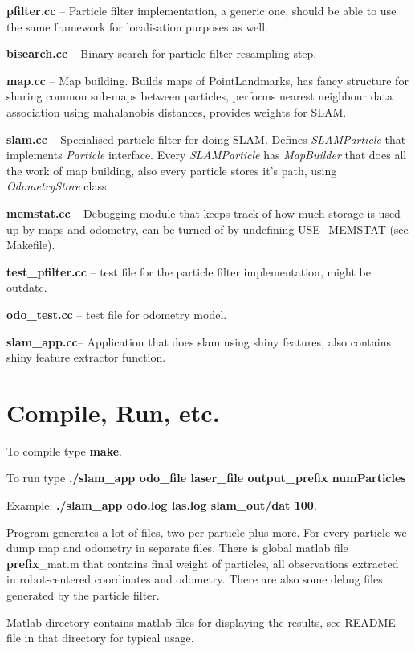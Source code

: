 \documentclass{article}
\begin{document}
\textbf{ pfilter.cc }-- Particle filter implementation, a generic
one, should be able to use the same framework for localisation
purposes as well.

\textbf{ bisearch.cc }-- Binary search for particle filter resampling step.

\textbf{ map.cc }-- Map building. Builds maps of PointLandmarks, has
fancy structure for sharing common sub-maps between particles, performs
nearest neighbour data association using mahalanobis distances,
provides weights for SLAM.

\textbf{ slam.cc }-- Specialised particle filter for doing
SLAM. Defines \textit{SLAMParticle} that implements \textit{Particle}
interface. Every \textit{SLAMParticle} has \textit{MapBuilder} that
does all the work of map building, also every particle stores it's
path, using \textit{OdometryStore} class.

\textbf{ memstat.cc }-- Debugging module that keeps track of how much
storage is used up by maps and odometry, can be turned of by
undefining USE\_MEMSTAT (see Makefile).

\textbf{ test\_pfilter.cc }-- test file for the particle filter
implementation, might be outdate.

\textbf{ odo\_test.cc }-- test file for odometry model.

\textbf{ slam\_app.cc}-- Application that does slam using shiny
features, also contains shiny feature extractor function.

\section{Compile, Run, etc.}

To compile type \textbf{make}.

To run type \textbf{./slam\_app odo\_file laser\_file output\_prefix
numParticles}

Example: \textbf{./slam\_app odo.log las.log slam\_out/dat 100}.

Program generates a lot of files, two per particle plus more. For
every particle we dump map and odometry in separate files. There is
global matlab file \textbf{prefix}\_mat.m that contains final weight of
particles, all observations extracted in robot-centered coordinates
and odometry. There are also some debug files generated by the
particle filter.

Matlab directory contains matlab files for displaying the results, see
README file in that directory for typical usage.
\end{document}
